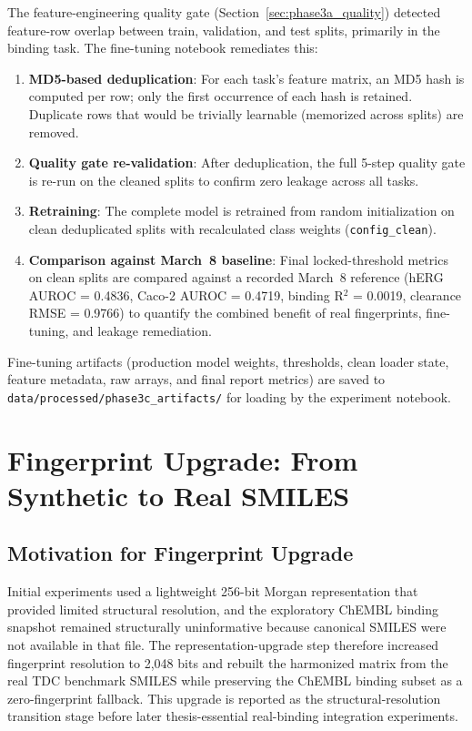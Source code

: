 \documentclass[a4paper,11pt,twoside]{report}
\begin{document}
The feature-engineering quality gate (Section~\ref{sec:phase3a_quality}) detected feature-row overlap between train, validation, and test splits, primarily in the binding task. The fine-tuning notebook remediates this:
\begin{enumerate}
  \item \textbf{MD5-based deduplication}: For each task's feature matrix, an MD5 hash is computed per row; only the first occurrence of each hash is retained. Duplicate rows that would be trivially learnable (memorized across splits) are removed.
  \item \textbf{Quality gate re-validation}: After deduplication, the full 5-step quality gate is re-run on the cleaned splits to confirm zero leakage across all tasks.
  \item \textbf{Retraining}: The complete model is retrained from random initialization on clean deduplicated splits with recalculated class weights (\texttt{config\_clean}).
  \item \textbf{Comparison against March~8 baseline}: Final locked-threshold metrics on clean splits are compared against a recorded March~8 reference (hERG AUROC = 0.4836, Caco-2 AUROC = 0.4719, binding R$^2$ = 0.0019, clearance RMSE = 0.9766) to quantify the combined benefit of real fingerprints, fine-tuning, and leakage remediation.
\end{enumerate}

Fine-tuning artifacts (production model weights, thresholds, clean loader state, feature metadata, raw arrays, and final report metrics) are saved to \texttt{data/processed/phase3c\_artifacts/} for loading by the experiment notebook.

\section{Fingerprint Upgrade: From Synthetic to Real SMILES}

\subsection{Motivation for Fingerprint Upgrade}

Initial experiments used a lightweight 256-bit Morgan representation that provided limited structural resolution, and the exploratory ChEMBL binding snapshot remained structurally uninformative because canonical SMILES were not available in that file. The representation-upgrade step therefore increased fingerprint resolution to 2,048 bits and rebuilt the harmonized matrix from the real TDC benchmark SMILES while preserving the ChEMBL binding subset as a zero-fingerprint fallback. This upgrade is reported as the structural-resolution transition stage before later thesis-essential real-binding integration experiments.
\end{document}
